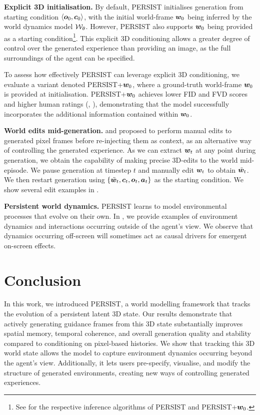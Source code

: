 \documentclass{article}
\theoremstyle{plain}
\theoremstyle{definition}
\theoremstyle{remark}
\begin{document}
\textbf{Explicit 3D initialisation.} By default, PERSIST initialises generation from starting condition $\langle {\bm{o}}_0, {\bm{c}}_0\rangle$, with the initial world-frame ${\bm{w}}_0$ being inferred by the world dynamics model ${\mathcal{W}}_\theta$. However, PERSIST also supports ${\bm{w}}_0$ being provided as a starting condition\footnote{See  for the respective inference algorithms of PERSIST and PERSIST+${\bm{w}}_0$.}. This explicit 3D conditioning allows a greater degree of control over the generated experience than providing an image, as the full surroundings of the agent can be specified.


To assess how effectively PERSIST can leverage explicit 3D conditioning, we evaluate a variant denoted PERSIST+${\bm{w}}_0$, where a ground-truth world-frame ${\bm{w}}_0$ is provided at initialisation. PERSIST+${\bm{w}}_0$ achieves lower FID and FVD scores and higher human ratings (, ), demonstrating that the model successfully incorporates the additional information contained within ${\bm{w}}_0$. %

\textbf{World edits mid-generation.} \citet{valevski2024diffusionmodelsrealtimegame} and \citet{kanervisto2025world} proposed to perform manual edits to generated pixel frames before re-injecting them as context, as an alternative way of controlling the generated experience. As we can extract ${\bm{w}}_t$ at any point during generation, we obtain the capability of making precise 3D-edits to the world mid-episode. We pause generation at timestep $t$ and manually edit ${\bm{w}}_t$ to obtain $\tilde{{\bm{w}}}_t$. We then restart generation using $\{\tilde{{\bm{w}}}_t, {\bm{c}}_t, {\bm{o}}_t, {\bm{a}}_t\}$ as the starting condition. We show several edit examples in . 

\textbf{Persistent world dynamics.} PERSIST learns to model environmental processes that evolve on their own. In , we provide examples of environment dynamics and interactions occurring outside of the agent's view. We observe that dynamics occurring off-screen will sometimes act as causal drivers for emergent on-screen effects.

\vspace{-0.25cm}
\section{Conclusion}
\vspace{-0.22cm}
In this work, we introduced PERSIST, a world modelling framework that tracks the evolution of a persistent latent 3D state. Our results demonstrate that actively generating guidance frames from this 3D state substantially improves spatial memory, temporal coherence, and overall generation quality and stability compared to conditioning on pixel-based histories. We show that tracking this 3D world state allows the model to capture environment dynamics occurring beyond the agent's view. Additionally, it lets users pre-specify, visualise, and modify the structure of generated environments, creating new ways of controlling generated experiences.
\end{document}

